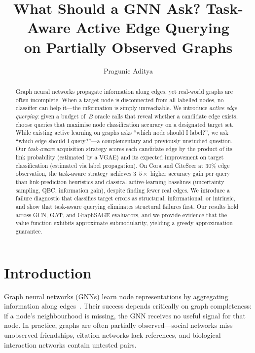\documentclass{article}
\title{What Should a GNN Ask? Task-Aware Active Edge Querying\\on Partially Observed Graphs}
\author{Pragunie Aditya}
\date{}
\begin{document}
\maketitle

\begin{abstract}
Graph neural networks propagate information along edges, yet real-world graphs are often incomplete.
When a target node is disconnected from all labelled nodes, no classifier can help it---the information is simply unreachable.
We introduce \emph{active edge querying}: given a budget of~$B$ oracle calls that reveal whether a candidate edge exists, choose queries that maximise node classification accuracy on a designated target set.
While existing active learning on graphs asks ``which node should I label?'', we ask ``which edge should I query?''---a complementary and previously unstudied question.
Our \emph{task-aware} acquisition strategy scores each candidate edge by the product of its link probability (estimated by a VGAE) and its expected improvement on target classification (estimated via label propagation).
On Cora and CiteSeer at 30\% edge observation, the task-aware strategy achieves $3\text{--}5\times$ higher accuracy gain per query than link-prediction heuristics and classical active-learning baselines (uncertainty sampling, QBC, information gain), despite finding fewer real edges.
We introduce a failure diagnostic that classifies target errors as structural, informational, or intrinsic, and show that task-aware querying eliminates structural failures first.
Our results hold across GCN, GAT, and GraphSAGE evaluators, and we provide evidence that the value function exhibits approximate submodularity, yielding a greedy approximation guarantee.
\end{abstract}


\section{Introduction}
\label{sec:intro}

Graph neural networks (GNNs) learn node representations by aggregating information along edges~\cite{kipf2017semi,hamilton2017inductive,velickovic2018graph}.
Their success depends critically on graph completeness: if a node's neighbourhood is missing, the GNN receives no useful signal for that node.
In practice, graphs are often partially observed---social networks miss unobserved friendships, citation networks lack references, and biological interaction networks contain untested pairs.
\end{document}
